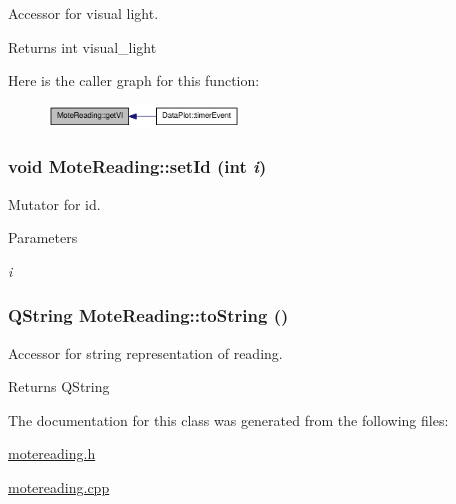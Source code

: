 Accessor for visual light. 

\begin{DoxyReturn}{Returns}
int visual\_\-light 
\end{DoxyReturn}


Here is the caller graph for this function:\nopagebreak
\begin{figure}[H]
\begin{center}
\leavevmode
\includegraphics[width=144pt]{classMoteReading_a88ed6ea245c7af79e38ff8976f849f36_icgraph}
\end{center}
\end{figure}


\hypertarget{classMoteReading_a61f08f015a9f833ff7352c378b7799c2}{
\subsubsection[{setId}]{\setlength{\rightskip}{0pt plus 5cm}void MoteReading::setId (int {\em i})}}
\label{classMoteReading_a61f08f015a9f833ff7352c378b7799c2}


Mutator for id. 


\begin{DoxyParams}{Parameters}
\item[{\em i}]\end{DoxyParams}
\hypertarget{classMoteReading_a5e60715c001c14f3e3f4cff6f886f0ad}{
\subsubsection[{toString}]{\setlength{\rightskip}{0pt plus 5cm}QString MoteReading::toString ()}}
\label{classMoteReading_a5e60715c001c14f3e3f4cff6f886f0ad}


Accessor for string representation of reading. 

\begin{DoxyReturn}{Returns}
QString 
\end{DoxyReturn}


The documentation for this class was generated from the following files:\begin{DoxyCompactItemize}
\item 
\hyperlink{motereading_8h}{motereading.h}\item 
\hyperlink{motereading_8cpp}{motereading.cpp}\end{DoxyCompactItemize}
